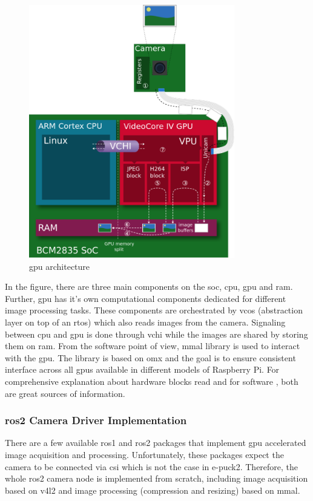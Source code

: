  \begin{figure}[H]
    \centering
    \includegraphics[width=0.8\textwidth]{physical/figures/gpu_architecture}
    \caption{\ac{gpu} architecture \cite{noauthor_videocore_nodate-1}}
    \label{fig:physical:gpu_architecture}
\end{figure}

In the figure, there are three main components on the \ac{soc}, \ac{cpu}, \ac{gpu} and \ac{ram}.
Further, \ac{gpu} has it's own computational components dedicated for different image processing tasks.
These components are orchestrated by \ac{vcos} (abstraction layer on top of an \ac{rtos}) which also reads images from the camera.
Signaling between \ac{cpu} and \ac{gpu} is done through \ac{vchi} while the images are shared by storing them on \ac{ram}.
From the software point of view, \ac{mmal} library is used to interact with the \ac{gpu}.
The library is based on \ac{omx} and the goal is to ensure consistent interface across all \acp{gpu} available in different models of Raspberry Pi.
For comprehensive explanation about hardware blocks read \cite{noauthor_videocore_nodate-1} and for software \cite{noauthor_videocore_nodate}, both are great sources of information.

\subsubsection{\ac{ros2} Camera Driver Implementation}
There are a few available \ac{ros1} and \ac{ros2} packages that implement \ac{gpu} accelerated image acquisition and processing.
Unfortunately, these packages expect the camera to be connected via \ac{csi} which is not the case in e-puck2. 
Therefore, the whole \ac{ros2} camera node is implemented from scratch, including image acquisition based on \ac{v4l2} and image processing (compression and resizing) based on \ac{mmal}.
 
